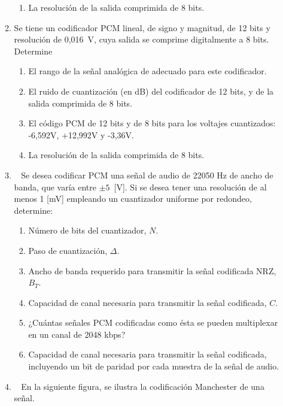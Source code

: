 \begin{enumerate}
\begin{enumerate}
\begin{enumerate}
	\item La resolución de la salida comprimida de 8 bits.
\end{enumerate}
\item Se tiene un codificador PCM lineal, de signo y magnitud, de 12 bits y resolución de 0,016~V, cuya salida se comprime digitalmente a 8 bits. Determine
\begin{enumerate}
	\item El rango de la señal analógica de adecuado para este codificador.
	\item El ruido de cuantización (en dB) del codificador de 12 bits, y de la salida comprimida de 8 bits.
	\item El código PCM de 12 bits y de 8 bits para los voltajes cuantizados: -6,592V, +12,992V y -3,36V.
	\item La resolución de la salida comprimida de 8 bits.
\end{enumerate}


\item~
Se desea codificar PCM una señal de audio de 22050 Hz de ancho de banda, que varía entre $\pm 5$~[V]. Si se desea tener una resolución de al menos 1 [mV] empleando un cuantizador uniforme por redondeo, determine:
\begin{enumerate}
	\item Número de bits del cuantizador, $N$.
	
	\item Paso de cuantización, $\Delta$.
	
	\item Ancho de banda requerido para transmitir la señal codificada NRZ, $B_T$.
	
	\item Capacidad de canal necesaria para transmitir la señal codificada, $C$.
	
	\item ¿Cuántas señales PCM codificadas como ésta se pueden multiplexar en un canal de 2048 kbps?
	
	\item Capacidad de canal necesaria para transmitir la señal codificada, incluyendo un bit de paridad por cada muestra de la señal de audio.
\end{enumerate}


\item~
En la siguiente figura, se ilustra la codificación Manchester de una señal. \\


\end{enumerate}
\end{enumerate}
